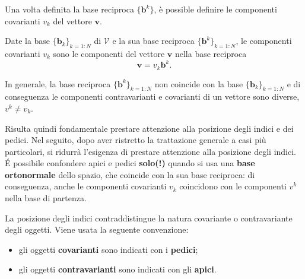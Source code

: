 %
Una volta definita la base reciproca $\{ \bm{b}^k \}$, è possible definire le componenti covarianti $v_k$ del vettore $\bm{v}$.
\begin{definition}
Date la base $\{ \bm{b}_k \}_{k=1:N}$ di $\mathcal{V}$ e la sua base reciproca $\{ \bm{b}^k \}_{k=1:N}$, le componenti covarianti $v_k$ sono le componenti del vettore $\bm{v}$ nella base reciproca
 \begin{equation}\label{eqn:def:bd}
   \bm{v} =v_k \bm{b}^k .
 \end{equation}
\end{definition}
%
\begin{remark}
 In generale, la base reciproca $\{ \bm{b}^k \}_{k=1:N}$ non coincide con la base $\{ \bm{b}_k \}_{k=1:N}$ e di conseguenza le componenti contravarianti e covarianti di un vettore sono diverse, $v^k \neq v_k$.

 Risulta quindi fondamentale prestare attenzione alla posizione degli indici e dei pedici. Nel seguito, dopo aver ristretto la trattazione generale a casi più particolari, si ridurrà l'esigenza di prestare attenzione alla posizione degli indici.
    \'E possibile confondere apici e pedici \textbf{solo(!)} quando si usa una \textbf{base ortonormale} dello spazio, che coincide con la sua base reciproca: di conseguenza, anche le componenti covarianti $v_k$ coincidono con le componenti $v^k$ nella base di partenza.
\end{remark}
%
La posizione degli indici contraddistingue la natura covariante o contravariante degli oggetti. Viene usata la seguente convenzione:
\begin{itemize}
\item gli oggetti \textbf{covarianti} sono indicati con i \textbf{pedici};
\item gli oggetti \textbf{contravarianti} sono indicati con gli \textbf{apici}.
\end{itemize}
